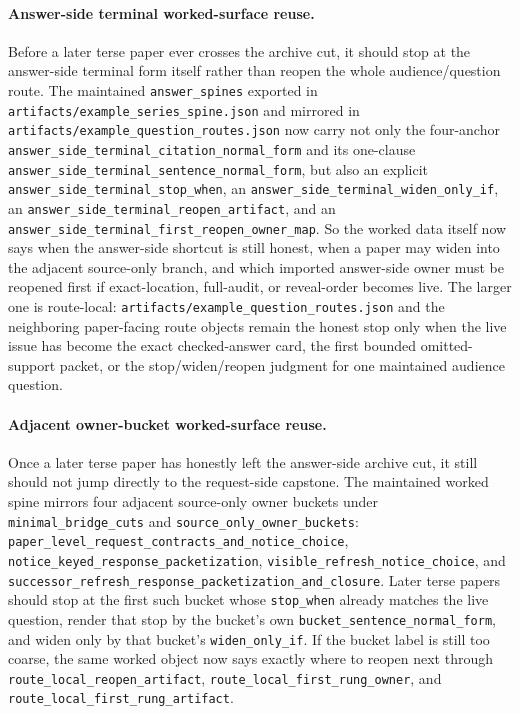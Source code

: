 \documentclass[11pt]{article}
\begin{document}
\paragraph{Answer-side terminal worked-surface reuse.}
Before a later terse paper ever crosses the archive cut, it should stop at the answer-side terminal form itself rather than reopen the whole audience/question route. The maintained \texttt{answer\_spines} exported in \nolinkurl{artifacts/example\_series\_spine.json} and mirrored in \nolinkurl{artifacts/example\_question\_routes.json} now carry not only the four-anchor \texttt{answer\_side\_terminal\_citation\_normal\_form} and its one-clause \texttt{answer\_side\_terminal\_sentence\_normal\_form}, but also an explicit \texttt{answer\_side\_terminal\_stop\_when}, an \texttt{answer\_side\_terminal\_widen\_only\_if}, an \texttt{answer\_side\_terminal\_reopen\_artifact}, and an \texttt{answer\_side\_terminal\_first\_reopen\_owner\_map}. So the worked data itself now says when the answer-side shortcut is still honest, when a paper may widen into the adjacent source-only branch, and which imported answer-side owner must be reopened first if exact-location, full-audit, or reveal-order becomes live. The larger one is route-local: \nolinkurl{artifacts/example_question_routes.json} and the neighboring paper-facing route objects remain the honest stop only when the live issue has become the exact checked-answer card, the first bounded omitted-support packet, or the stop/widen/reopen judgment for one maintained audience question.

\paragraph{Adjacent owner-bucket worked-surface reuse.}
Once a later terse paper has honestly left the answer-side archive cut, it still should not jump directly to the request-side capstone. The maintained worked spine mirrors four adjacent source-only owner buckets under \texttt{minimal\_bridge\_cuts} and \texttt{source\_only\_owner\_buckets}: \texttt{paper\_level\_request\_contracts\_and\_notice\_choice}, \texttt{notice\_keyed\_response\_packetization}, \texttt{visible\_refresh\_notice\_choice}, and \texttt{successor\_refresh\_response\_packetization\_and\_closure}. Later terse papers should stop at the first such bucket whose \texttt{stop\_when} already matches the live question, render that stop by the bucket's own \texttt{bucket\_sentence\_normal\_form}, and widen only by that bucket's \texttt{widen\_only\_if}. If the bucket label is still too coarse, the same worked object now says exactly where to reopen next through \texttt{route\_local\_reopen\_artifact}, \texttt{route\_local\_first\_rung\_owner}, and \texttt{route\_local\_first\_rung\_artifact}.\cite{series:seriesspines}
\end{document}
